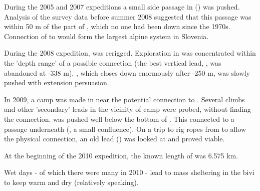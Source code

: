 \newpage


During the 2005 and 2007 expeditions a small side passage in 
() was pushed. Analysis of the survey data before
summer 2008 suggested that this passage was within 50 m of the 
part of , which no one had been down since the 1970s. Connection
of  to  would form the largest alpine system in Slovenia.

During the 2008 expedition,  was rerigged. Exploration in 
was concentrated within the 'depth range' of a possible  connection
(the best vertical lead, , was abandoned at -338 m).
, which closes down enormously after -250 m, was slowly pushed with
extension persuasion. 

In 2009, a camp was made in  near the potential connection
to . Several climbs and other 'secondary' leads in the vicinity
of camp were probed, without finding the connection. 
was pushed well below the bottom of . This connected to a passage underneath
 (, a small confluence). 
On a trip to rig ropes from  to allow the physical
connection, an old lead () was looked at and proved viable.

At the beginning of the 2010 expedition, the known length of  was 6.575 km.

\begin{pagefigure}
\checkoddpage \ifoddpage \forcerectofloat \else \forceversofloat \fi
\centering
 \caption{Wet days - of which there were many in 2010 - lead to mass sheltering in the bivi to keep warm and dry (relatively speaking). }
 \label{wet bivi 2010}
\end{pagefigure}
